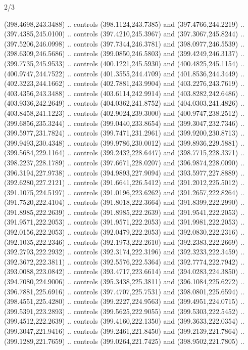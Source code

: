 \begin{flagdescription}{2/3}
\begin{scope}[xshift=0.5\flaglength,yshift=0.5\flagwidth,scale=\flagwidth/495.65]
\begin{scope}[y=0.8pt, x=0.8pt, yscale=-1,shift={(-463.76,-309.78)}]
  (398.4698,243.3488) .. controls (398.1124,243.7385) and (397.4766,244.2219) ..
  (397.4385,245.0100) .. controls (397.4210,245.3967) and (397.3067,245.8244) ..
  (397.5206,246.0998) .. controls (397.7344,246.3781) and (398.0977,246.5539) ..
  (398.6309,246.5686) .. controls (399.0850,246.5803) and (399.4249,246.3137) ..
  (399.7735,245.9533) .. controls (400.1221,245.5930) and (400.4825,245.1154) ..
  (400.9747,244.7522) .. controls (401.3555,244.4709) and (401.8536,244.3449) ..
  (402.3223,244.1662) .. controls (402.7881,243.9904) and (403.2276,243.7619) ..
  (403.4356,243.3488) .. controls (403.6114,242.9914) and (403.8282,242.6486) ..
  (403.9336,242.2649) .. controls (404.0362,241.8752) and (404.0303,241.4826) ..
  (403.8458,241.1223) .. controls (402.9024,239.3000) and (400.9747,238.2512) ..
  (399.6856,235.3244) .. controls (399.0440,233.8654) and (399.3047,232.7346) ..
  (399.5977,231.7824) .. controls (399.7471,231.2961) and (399.9200,230.8713) ..
  (399.9493,230.4348) .. controls (399.9786,230.0012) and (399.8936,229.5881) ..
  (399.5684,229.1164) .. controls (399.2432,228.6447) and (398.7715,228.3371) ..
  (398.2237,228.1789) .. controls (397.6671,228.0207) and (396.9874,228.0090) ..
  (396.3194,227.9738) .. controls (394.9893,227.9094) and (393.5977,227.8889) ..
  (392.6280,227.2121) .. controls (391.6641,226.5412) and (391.2012,225.5012) ..
  (391.1075,224.5197) .. controls (391.0196,223.6262) and (391.2657,222.8264) ..
  (391.7520,222.4104) .. controls (391.8018,222.3664) and (391.8399,222.2990) ..
  (391.8985,222.2639) .. controls (391.8985,222.2639) and (391.9541,222.2053) ..
  (391.9571,222.2053) .. controls (391.9571,222.2053) and (391.9981,222.2053) ..
  (392.0156,222.2053) .. controls (392.0479,222.2053) and (392.0830,222.2316) ..
  (392.1035,222.2346) .. controls (392.1973,222.2610) and (392.2383,222.2669) ..
  (392.2793,222.2932) .. controls (392.3174,222.3196) and (392.3233,222.3459) ..
  (392.3672,222.3811) .. controls (392.5576,222.5364) and (392.7774,222.7942) ..
  (393.0088,223.0842) .. controls (393.4717,223.6614) and (394.0283,224.3850) ..
  (394.7080,224.9006) .. controls (395.3438,225.3811) and (396.1084,225.6272) ..
  (396.7881,225.6916) .. controls (397.4707,225.7531) and (398.0801,225.6594) ..
  (398.4551,225.4280) .. controls (399.2227,224.9563) and (399.4951,224.0715) ..
  (399.5391,223.2893) .. controls (399.5625,222.9055) and (399.5303,222.5452) ..
  (399.4512,222.2639) .. controls (399.4160,222.1350) and (399.3633,222.0354) ..
  (399.3047,221.9416) .. controls (399.2461,221.8450) and (399.2139,221.7864) ..
  (399.1289,221.7659) .. controls (399.0264,221.7425) and (398.9502,221.7805) ..

\end{scope}
\end{scope}
\end{flagdescription}
